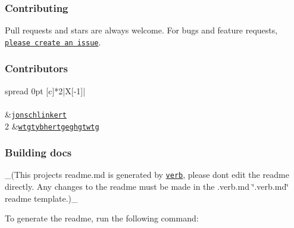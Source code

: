 {\ttfamily \subsubsection*{Contributing}}

{\ttfamily }

{\ttfamily Pull requests and stars are always welcome. For bugs and feature requests, \href{../../issues/new}{\tt please create an issue}.}

{\ttfamily \subsubsection*{Contributors}}

{\ttfamily }

{\ttfamily \tabulinesep=1mm
\begin{longtabu} spread 0pt [c]{*{2}{|X[-1]}|}
\hline
\rowcolor{\tableheadbgcolor}\\
\endfirsthead
\hline
\endfoot
\hline
\rowcolor{\tableheadbgcolor}\\
  &\href{https://github.com/jonschlinkert}{\tt jonschlinkert}   \\
2  &\href{https://github.com/wtgtybhertgeghgtwtg}{\tt wtgtybhertgeghgtwtg}   \\
\end{longtabu}
}

{\ttfamily \subsubsection*{Building docs}}

{\ttfamily }

{\ttfamily \+\_\+(This project\textquotesingle{}s readme.\+md is generated by \href{https://github.com/verbose/verb-generate-readme}{\tt verb}, please don\textquotesingle{}t edit the readme directly. Any changes to the readme must be made in the .verb.\+md \char`\"{}.\+verb.\+md\char`\"{} readme template.)\+\_\+}

{\ttfamily To generate the readme, run the following command\+:}

{\ttfamily 
{}
}

